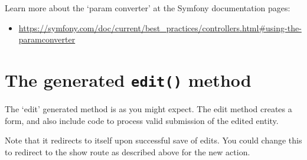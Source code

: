 \documentclass[a4paperpaper,openright]{book}
\newenvironment{Shaded}{}{}
\newcommand{\AnnotationTok}[1]{\textcolor[rgb]{0.38,0.63,0.69}{\textbf{\textit{#1}}}}
\newcommand{\CommentTok}[1]{\textcolor[rgb]{0.38,0.63,0.69}{\textit{#1}}}
\newcommand{\FunctionTok}[1]{\textcolor[rgb]{0.02,0.16,0.49}{#1}}
\newcommand{\KeywordTok}[1]{\textcolor[rgb]{0.00,0.44,0.13}{\textbf{#1}}}
\newcommand{\NormalTok}[1]{#1}
\newcommand{\OtherTok}[1]{\textcolor[rgb]{0.00,0.44,0.13}{#1}}
\newcommand{\StringTok}[1]{\textcolor[rgb]{0.25,0.44,0.63}{#1}}
\providecommand{\tightlist}{%
  \setlength{\itemsep}{0pt}\setlength{\parskip}{0pt}}
\begin{document}
Learn more about the `param converter' at the Symfony documentation
pages:

\begin{itemize}
\tightlist
\item
  \url{https://symfony.com/doc/current/best_practices/controllers.html\#using-the-paramconverter}
\end{itemize}

\hypertarget{the-generated-edit-method}{%
\section{\texorpdfstring{The generated \texttt{edit()}
method}{The generated edit() method}}\label{the-generated-edit-method}}

The `edit' generated method is as you might expect. The edit method
creates a form, and also include code to process valid submission of the
edited entity.

Note that it redirects to itself upon successful save of edits. You
could change this to redirect to the show route as described above for
the new action.

\begin{Shaded}
\end{Shaded}
\end{document}
